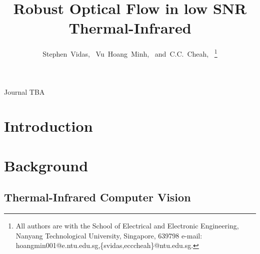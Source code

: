 \documentclass[journal]{IEEEtran}
\begin{document}
\title{Robust Optical Flow in low SNR Thermal-Infrared}

\author{Stephen~Vidas,~
        Vu~Hoang~Minh,~
        and~C.C.~Cheah,~%
\thanks{All authors are with the School of Electrical and Electronic Engineering,
Nanyang Technological University, Singapore, 639798
e-mail: hoangmin001@e.ntu.edu.sg,\{svidas,ecccheah\}@ntu.edu.sg.}%
}

%
{Journal TBA}
%

\maketitle

\begin{abstract}

\end{abstract}


\IEEEpeerreviewmaketitle

\section{Introduction}
\label{sec:introduction}


\section{Background}
\label{sec:background}


\subsection{Thermal-Infrared Computer Vision}
\label{sec:background_thermal}

\end{document}
